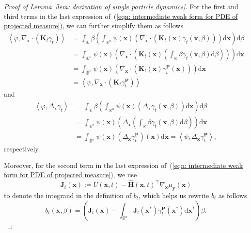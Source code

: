 \documentclass{article}
\numberwithin{equation}{section}
\def\eqref#1{(\ref{#1})}
\newcommand{\dif}{{\mathrm{d}}}
\def\vx{{\bm{x}}}
\def\vy{{\bm{y}}}
\def\mH{{\bm{H}}}
\def\mJ{{\bm{J}}}
\def\mK{{\bm{K}}}
\def\mP{{\bm{P}}}
\begin{document}
\begin{proof}[Proof of Lemma~\ref{lem: derivation of single particle dynamics}]
    For the first and third terms in the last expression of~\eqref{eqn: intermediate weak form for PDE of projected measure}, we can further simplify them as follows
    \begin{equation}
    \label{eqn: derivation of first term}
    \begin{aligned}
    \left\langle \varphi, \nabla_{\vx} \cdot \left(\mK_{t}\gamma_t\right) \right\rangle &= \int_{\mathbb{R}}\beta\left(\int_{\mathbb{R}^n}\psi(\vx)\left(\nabla_{\vx} \cdot\left(\mK_t(\vx) \gamma_t(\vx,\beta)\right)\right)\dif\vx\right)\dif\beta\\
    &= \int_{\mathbb{R}^n}\psi(\vx)\left(\nabla_{\vx} \cdot\left(\mK_t(\vx) \left(\int_{\mathbb{R}}\beta\gamma_t(\vx,\beta)\dif\beta\right)\right)\right)\dif\vx\\
    &= \int_{\mathbb{R}^n}\psi(\vx)\left(\nabla_{\vx} \cdot\left(\mK_t(\vx)\gamma^{\mP}_t(\vx)\right)\right)\dif\vx \\
    &=\left\langle\psi,\nabla_{\vx}\cdot(\mK_{t}\gamma^{\mP}_t)\right\rangle
    \end{aligned}    
    \end{equation}
    and 
    \begin{equation}
        \label{eqn: derivation of third term}
        \begin{aligned}
            \left\langle \varphi, \Delta_{\vx}\gamma_t \right\rangle &= \int_{\mathbb{R}}\beta\left(\int_{\mathbb{R}^n}\psi(\vx)\left(\Delta_{\vx}\gamma_t(\vx,\beta)\right)\dif\vx\right)\dif\beta\\
            &= \int_{\mathbb{R}^n}\psi(\vx)\left(\Delta_{\vx}\left(\int_{\mathbb{R}}\beta\gamma_t(\vx,\beta)\dif\beta\right)\right)\dif\vx\\
            &= \int_{\mathbb{R}^n}\psi(\vx)\left(\Delta_{\vx}\gamma^{\mP}_t\right)(\vx)\dif\vx = \left\langle\psi,\Delta_{\vx}\gamma^{\mP}_t\right\rangle,
        \end{aligned}
    \end{equation}
    respectively.

    Moreover, for the second term in the last expression of~\eqref{eqn: intermediate weak form for PDE of projected measure}, we use 
    \begin{equation}
    \label{eqn: defn of J_t}
    \mJ_t(\vx) := U(\vx,t) - \widehat{\mH}(\vx,t)^\intercal\nabla_{\vx}\mu_{\vy}(\vx)
    \end{equation} 
    to denote the integrand in the definition of $b_t$, which helps us rewrite $b_t$ as follows
    $$b_t(\vx,\beta) = \left(\mJ_t(\vx)-\int_{\mathbb{R}^n}\mJ_t(\vx^\ast)\gamma^{\mP}_t(\vx^\ast)\dif\vx^\ast\right)\beta.$$


\end{proof}
\end{document}
